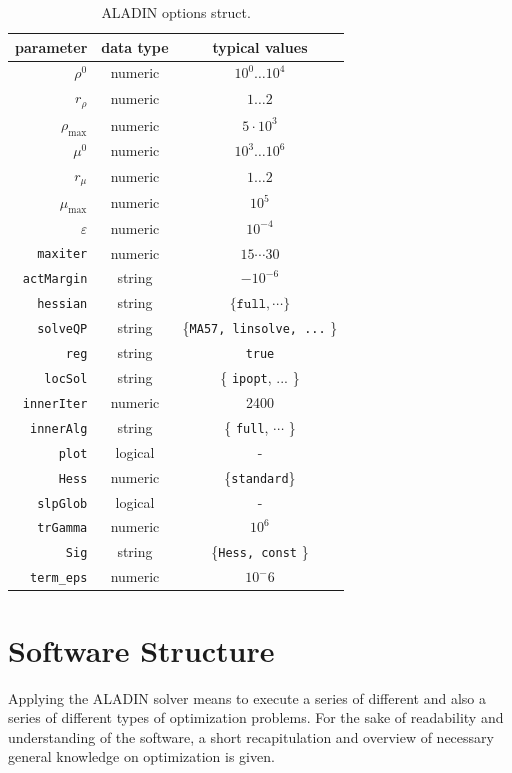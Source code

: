 \documentclass[]{scrartcl}
\begin{document}
\begin{table}
	\centering
	\begin{tabular}{rcc}
		\hline
parameter & data type & typical values \\ 
\hline
$\rho^0$	& numeric  & $10^0 \dots 10^4$ \\ 
	\hline 
$r_\rho$	& numeric  & $1 \dots 2$ \\ 
	\hline 
$\rho_{\text{max}}$ & numeric & $ 5 \cdot 10^3$ \\
    \hline
$\mu^0$	& numeric  & $10^3 \dots 10^6$ \\ 
	\hline 
$r_\mu$	& numeric  & $1 \dots 2$  \\ 
	\hline 
$\mu_\text{max}$ & numeric & $10^5$ \\
    \hline
$\varepsilon$ & numeric & $10^{-4}$ \\
    \hline
\texttt{maxiter} & numeric & $15 \cdots 30$ \\
    \hline
\texttt{actMargin} & string & $-10^{-6}$ \\
    \hline
\texttt{hessian} & string & $\{\texttt{full}, \cdots \}$\\
    \hline
\texttt{solveQP}    & string  & \{\texttt{MA57, linsolve, ...} \}  \\ 
    \hline 
\texttt{reg} & string & \texttt{true}\\
    \hline
\texttt{locSol}	& string  &\{ \texttt{ipopt}, ... \} \\ 
	\hline 
\texttt{innerIter} & numeric & 2400\\
    \hline
\texttt{innerAlg} & string & \{ \texttt{full}, $\cdots$ \}\\
    \hline
\texttt{plot}	& logical  & -  \\ 
	\hline 
\texttt{Hess} & numeric & \{\texttt{standard}\} \\
    \hline
\texttt{slpGlob} & logical & - \\
    \hline
\texttt{trGamma} & numeric & $10^6$ \\    
    \hline
\texttt{Sig}	& string  & \{\texttt{Hess, const} \} \\ 
	\hline 
\texttt{term\_eps} & numeric & $10^-6$\\
    \hline
\end{tabular} 
\caption{ALADIN options struct.}
\label{tab: ALADIN options struct.}
\end{table}

\section{Software Structure}
Applying the ALADIN solver means to execute a series of different and also a series of different types of optimization problems. For the sake of readability and understanding of the software, a short recapitulation and overview of necessary general knowledge on optimization is given.
\end{document}
